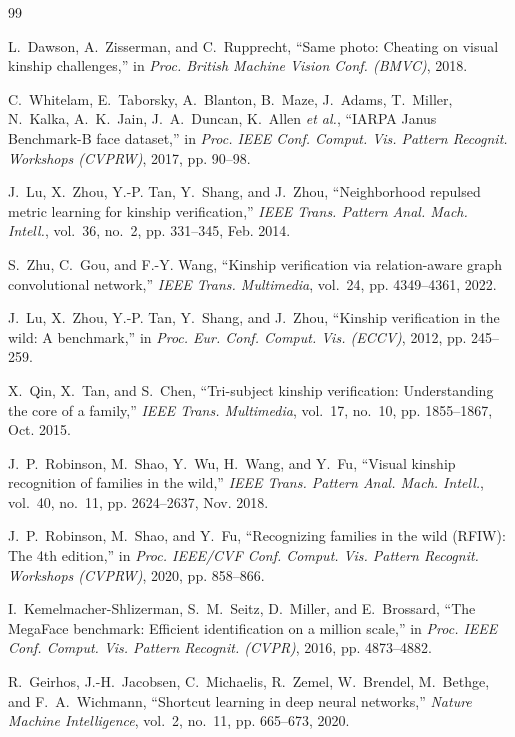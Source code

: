 \documentclass[journal,12pt]{IEEEtran}
\begin{document}
\begin{thebibliography}{99}

L.~Dawson, A.~Zisserman, and C.~Rupprecht, ``Same photo: Cheating on visual kinship challenges,'' in \emph{Proc. British Machine Vision Conf. (BMVC)}, 2018.

C.~Whitelam, E.~Taborsky, A.~Blanton, B.~Maze, J.~Adams, T.~Miller, N.~Kalka, A.~K.~Jain, J.~A.~Duncan, K.~Allen \emph{et al.}, ``IARPA Janus Benchmark-B face dataset,'' in \emph{Proc. IEEE Conf. Comput. Vis. Pattern Recognit. Workshops (CVPRW)}, 2017, pp. 90--98.

J.~Lu, X.~Zhou, Y.-P. Tan, Y.~Shang, and J.~Zhou, ``Neighborhood repulsed metric learning for kinship verification,'' \emph{IEEE Trans. Pattern Anal. Mach. Intell.}, vol.~36, no.~2, pp. 331--345, Feb. 2014.

S.~Zhu, C.~Gou, and F.-Y. Wang, ``Kinship verification via relation-aware graph convolutional network,'' \emph{IEEE Trans. Multimedia}, vol.~24, pp. 4349--4361, 2022.

J.~Lu, X.~Zhou, Y.-P. Tan, Y.~Shang, and J.~Zhou, ``Kinship verification in the wild: A benchmark,'' in \emph{Proc. Eur. Conf. Comput. Vis. (ECCV)}, 2012, pp. 245--259.

X.~Qin, X.~Tan, and S.~Chen, ``Tri-subject kinship verification: Understanding the core of a family,'' \emph{IEEE Trans. Multimedia}, vol.~17, no.~10, pp. 1855--1867, Oct. 2015.

J.~P.~Robinson, M.~Shao, Y.~Wu, H.~Wang, and Y.~Fu, ``Visual kinship recognition of families in the wild,'' \emph{IEEE Trans. Pattern Anal. Mach. Intell.}, vol.~40, no.~11, pp. 2624--2637, Nov. 2018.

J.~P.~Robinson, M.~Shao, and Y.~Fu, ``Recognizing families in the wild (RFIW): The 4th edition,'' in \emph{Proc. IEEE/CVF Conf. Comput. Vis. Pattern Recognit. Workshops (CVPRW)}, 2020, pp. 858--866.

I.~Kemelmacher-Shlizerman, S.~M.~Seitz, D.~Miller, and E.~Brossard, ``The MegaFace benchmark: Efficient identification on a million scale,'' in \emph{Proc. IEEE Conf. Comput. Vis. Pattern Recognit. (CVPR)}, 2016, pp. 4873--4882.

R.~Geirhos, J.-H.~Jacobsen, C.~Michaelis, R.~Zemel, W.~Brendel, M.~Bethge, and F.~A.~Wichmann, ``Shortcut learning in deep neural networks,'' \emph{Nature Machine Intelligence}, vol.~2, no.~11, pp. 665--673, 2020.


\end{thebibliography}
\end{document}
